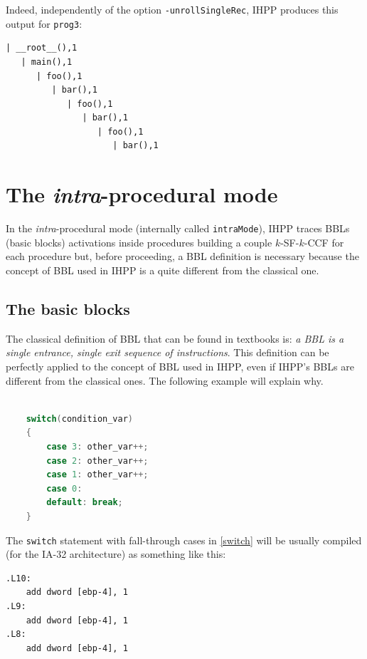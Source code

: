 \documentclass[a4paper,10pt]{report}
\begin{document}
\noindent
Indeed, independently of the option \verb|-unrollSingleRec|, 
IHPP produces this output for \verb|prog3|:
\begin{lstlisting}[label=out7, caption={IHPP partial output for \texttt{prog3}},frame=bottomline]
| __root__(),1
   | main(),1
      | foo(),1
         | bar(),1
            | foo(),1
               | bar(),1
                  | foo(),1
                     | bar(),1

\end{lstlisting}


\section{The \emph{intra}-procedural mode}

In the \emph{intra}-procedural mode (internally called \verb|intraMode|), 
IHPP traces BBLs (basic blocks) activations inside procedures building a couple $k$-SF-$k$-CCF for each procedure but, before proceeding, a BBL definition is necessary 
because the concept of BBL used in IHPP is a quite different from the classical one.

\subsection{The basic blocks}
The classical definition of BBL that can be found in textbooks is: \emph{a BBL is a single entrance, single exit sequence of instructions}. 
This definition can be perfectly applied to the concept of BBL used in IHPP, 
even if IHPP's BBLs are different from the classical ones. 
The following example will explain why.

\begin{lstlisting}[language=C, 
	caption={a switch statement}, label=switch, frame=leftline]

    switch(condition_var)
    {
        case 3: other_var++;
        case 2: other_var++;
        case 1: other_var++;
        case 0:
        default: break;
    }

\end{lstlisting}

\noindent
The \verb|switch| statement with fall-through cases in \cref{switch} 
will be usually compiled (for the IA-32 architecture) as something like this:

\begin{lstlisting}[language={[x86masm]Assembler}, 
	frame=leftline, label=asm1, caption={assembly code relative to \cref{switch}}]
.L10:
	add dword [ebp-4], 1
.L9:
	add dword [ebp-4], 1
.L8:
	add dword [ebp-4], 1
\end{lstlisting}
\end{document}
